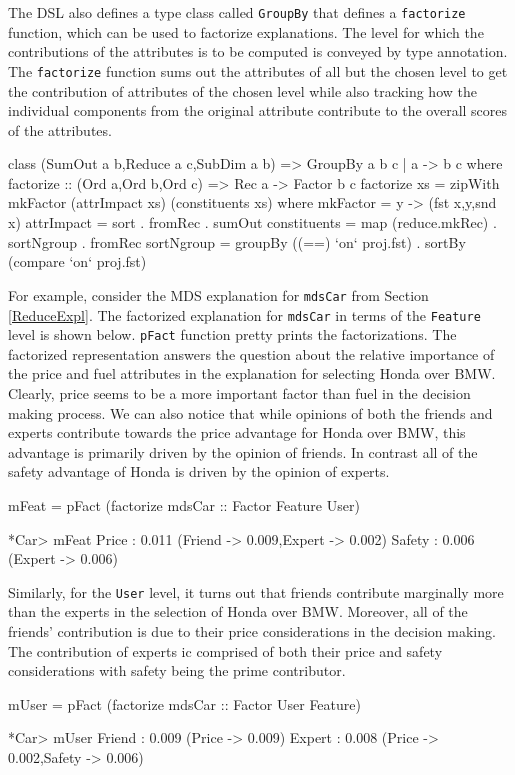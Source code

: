 \documentclass{jfp}
\newcommand{\prog}[1]{\texttt{#1}}
\begin{document}
The DSL also defines a type class called \prog{GroupBy} that defines a \prog{factorize} function, which can be used to factorize explanations. The level for which the contributions of the attributes is to be computed is conveyed by type annotation. The \prog{factorize} function sums out the attributes of all but the chosen level to get the contribution of attributes of the chosen level while also tracking how the individual components from the original attribute contribute to the overall scores of the attributes.
\begin{haskellcode}
class (SumOut a b,Reduce a c,SubDim a b) => GroupBy a b c | a -> b c where
  factorize :: (Ord a,Ord b,Ord c) => Rec a -> Factor b c
  factorize xs = zipWith mkFactor (attrImpact xs) (constituents xs)
      where mkFactor     = \x y -> (fst x,y,snd x)
            attrImpact   = sort . fromRec . sumOut
            constituents = map (reduce.mkRec) . sortNgroup . fromRec
            sortNgroup   = groupBy ((==) `on` proj.fst) 
                           . sortBy (compare `on` proj.fst)

\end{haskellcode}
For example, consider the MDS explanation for \prog{mdsCar} from Section \ref{ReduceExpl}. The factorized explanation for \prog{mdsCar} in terms of the \prog{Feature} level is shown below. \prog{pFact} function pretty prints the factorizations. The factorized representation answers the question about the relative importance of the price and fuel attributes in the explanation for selecting Honda over BMW. Clearly, price seems to be a more important factor than fuel in the decision making process. We can also notice that while opinions of both the friends and experts contribute towards the price advantage for Honda over BMW, this advantage is primarily driven by the opinion of friends. In contrast all of the safety advantage of Honda is driven by the opinion of experts.
\begin{haskellcode}
mFeat = pFact (factorize mdsCar :: Factor Feature User)

*Car> mFeat
Price  : 0.011 ({Friend -> 0.009,Expert -> 0.002})
Safety : 0.006 ({Expert -> 0.006})
\end{haskellcode}
Similarly, for the \prog{User} level, it turns out that friends contribute marginally more than the experts in the selection of Honda over BMW. Moreover, all of the friends' contribution is due to their price considerations in the decision making. The contribution of experts ic comprised of both their price and safety considerations with safety being the prime contributor. 
\begin{haskellcode}
mUser = pFact (factorize mdsCar :: Factor User Feature)

*Car> mUser
Friend : 0.009 ({Price -> 0.009})
Expert : 0.008 ({Price -> 0.002,Safety -> 0.006})
\end{haskellcode}
\end{document}
